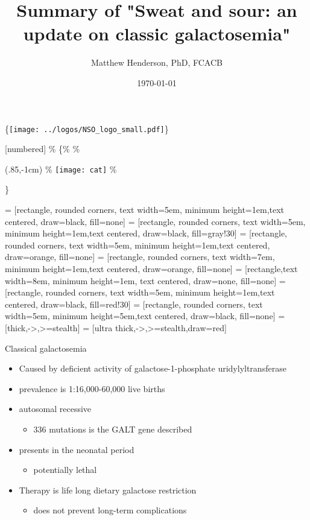 \documentclass[presentation, smaller]{beamer}
\author{Matthew Henderson, PhD, FCACB}
\date{\today}
\title{Summary of "Sweat and sour: an update on classic galactosemia"}
\institute[NSO]{Newborn Screening Ontario}
\begin{document}
\maketitle

\begin{LaTeX}
\logo\{\texttt{[image: ../logos/NSO\_logo\_small.pdf]}\}

\vspace{220pt}
\beamertemplatenavigationsymbolsempty
{}[numbered]
\% \{\%
\% \begin{textblock*}{100mm}(.85\textwidth,-1cm)
\% \texttt{[image: cat]}
\% \end{textblock*}\}


 = [rectangle, rounded corners, text width=5em, minimum height=1em,text centered, draw=black, fill=none]
 = [rectangle, rounded corners, text width=5em, minimum height=1em,text centered, draw=black, fill=gray!30]
 = [rectangle, rounded corners, text width=5em, minimum height=1em,text centered, draw=orange, fill=none]
 = [rectangle, rounded corners, text width=7em, minimum height=1em,text centered, draw=orange, fill=none]
 = [rectangle,text width=8em, minimum height=1em, text centered, draw=none, fill=none]
 = [rectangle, rounded corners, text width=5em, minimum height=1em,text centered, draw=black, fill=red!30]
 = [rectangle, rounded corners, text width=5em, minimum height=5em,text centered, draw=black, fill=none]
 = [thick,->,>=stealth]
 = [ultra thick,->,>=stealth,draw=red]
\end{LaTeX}




\begin{frame}[label={sec:orgf945789}]{Classical galactosemia}
\begin{itemize}
\item Caused by deficient activity of galactose-1-phosphate uridylyltransferase
\item prevalence is 1:16,000-60,000 live births
\item autosomal recessive
\begin{itemize}
\item 336 mutations is the GALT gene described
\end{itemize}

\item presents in the neonatal period
\begin{itemize}
\item potentially lethal
\end{itemize}

\item Therapy is life long dietary galactose restriction
\begin{itemize}
\item does not prevent long-term complications
\end{itemize}
\end{itemize}
\end{frame}
\end{document}
